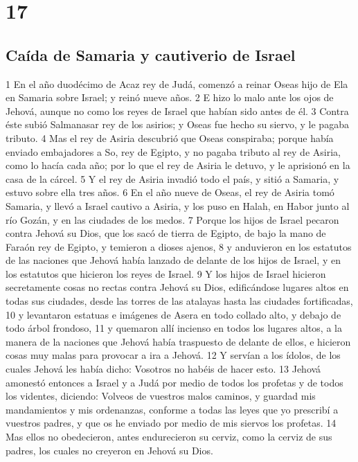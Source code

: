 \chapter{17}

\section*{Caída de Samaria y cautiverio de Israel}

1 En el año duodécimo de Acaz rey de Judá, comenzó a reinar Oseas hijo de Ela en Samaria sobre Israel; y reinó nueve años.
2 E hizo lo malo ante los ojos de Jehová, aunque no como los reyes de Israel que habían sido antes de él.
3 Contra éste subió Salmanasar rey de los asirios; y Oseas fue hecho su siervo, y le pagaba tributo.
4 Mas el rey de Asiria descubrió que Oseas conspiraba; porque había enviado embajadores a So, rey de Egipto, y no pagaba tributo al rey de Asiria, como lo hacía cada año; por lo que el rey de Asiria le detuvo, y le aprisionó en la casa de la cárcel.
5 Y el rey de Asiria invadió todo el país, y sitió a Samaria, y estuvo sobre ella tres años.
6 En el año nueve de Oseas, el rey de Asiria tomó Samaria, y llevó a Israel cautivo a Asiria, y los puso en Halah, en Habor junto al río Gozán, y en las ciudades de los medos.
7 Porque los hijos de Israel pecaron contra Jehová su Dios, que los sacó de tierra de Egipto, de bajo la mano de Faraón rey de Egipto, y temieron a dioses ajenos,
8 y anduvieron en los estatutos de las naciones que Jehová había lanzado de delante de los hijos de Israel, y en los estatutos que hicieron los reyes de Israel.
9 Y los hijos de Israel hicieron secretamente cosas no rectas contra Jehová su Dios, edificándose lugares altos en todas sus ciudades, desde las torres de las atalayas hasta las ciudades fortificadas,
10 y levantaron estatuas e imágenes de Asera en todo collado alto, y debajo de todo árbol frondoso, 
11 y quemaron allí incienso en todos los lugares altos, a la manera de la naciones que Jehová había traspuesto de delante de ellos, e hicieron cosas muy malas para provocar a ira a Jehová.
12 Y servían a los ídolos, de los cuales Jehová les había dicho: Vosotros no habéis de hacer esto.
13 Jehová amonestó entonces a Israel y a Judá por medio de todos los profetas y de todos los videntes, diciendo: Volveos de vuestros malos caminos, y guardad mis mandamientos y mis ordenanzas, conforme a todas las leyes que yo prescribí a vuestros padres, y que os he enviado por medio de mis siervos los profetas.
14 Mas ellos no obedecieron, antes endurecieron su cerviz, como la cerviz de sus padres, los cuales no creyeron en Jehová su Dios.
